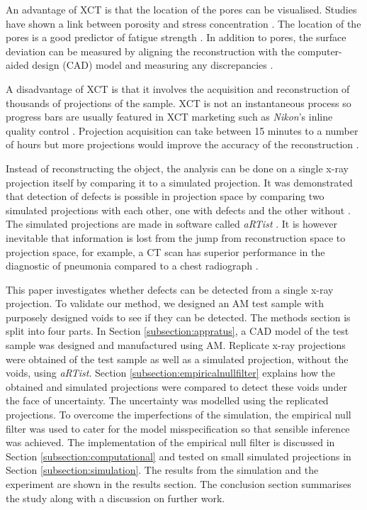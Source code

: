 \documentclass{article}
\begin{document}
An advantage of XCT is that the location of the pores can be visualised. Studies have shown a link between porosity and stress concentration \citep{carlton2016damage, leuders2015fatigue, siddique2015computed}. The location of the pores is a good predictor of fatigue strength \citep{leuders2015fatigue}. In addition to pores, the surface deviation can be measured by aligning the reconstruction with the computer-aided design (CAD) model and measuring any discrepancies \citep{kim2016inspection, lee2015compliance, villarraga2015assessing}.

A disadvantage of XCT is that it involves the acquisition and reconstruction of thousands of projections of the sample. XCT is not an instantaneous process so progress bars are usually featured in XCT marketing such as \emph{Nikon}'s inline quality control \citep{nikon2015inline}. Projection acquisition can take between 15 minutes to a number of hours \citep{warnett2016towards} but more projections would improve the accuracy of the reconstruction \citep{kruth2011computed}.

Instead of reconstructing the object, the analysis can be done on a single x-ray projection itself by comparing it to a simulated projection. It was demonstrated that detection of defects is possible in projection space by comparing two simulated projections with each other, one with defects and the other without \citep{brierley2018optimized}. The simulated projections are made in software called \emph{aRTist} \citep{bellon2012radiographic, bellon2007artist, jaenisch2008artist}. It is however inevitable that information is lost from the jump from reconstruction space to projection space, for example, a CT scan has superior performance in the diagnostic of pneumonia compared to a chest radiograph \citep{hayden2009chest}.

This paper investigates whether defects can be detected from a single x-ray projection. To validate our method, we designed an AM test sample with purposely designed voids to see if they can be detected. The methods section is split into four parts. In Section \ref{subsection:appratus}, a CAD model of the test sample was designed and manufactured using AM. Replicate x-ray projections were obtained of the test sample as well as a simulated projection, without the voids, using \emph{aRTist}. Section \ref{subsection:empiricalnullfilter} explains how the obtained and simulated projections were compared to detect these voids under the face of uncertainty. The uncertainty was modelled using the replicated projections. To overcome the imperfections of the simulation, the empirical null filter was used to cater for the model misspecification so that sensible inference was achieved. The implementation of the empirical null filter is discussed in Section \ref{subsection:computational} and tested on small simulated projections in Section \ref{subsection:simulation}. The results from the simulation and the experiment are shown in the results section. The conclusion section summarises the study along with a discussion on further work.
\end{document}
